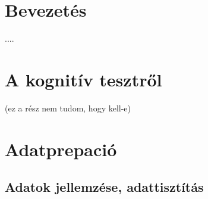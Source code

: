 \documentclass[12pt]{article}
\begin{document}
\tableofcontents


\section{Bevezetés}
....


\section{A kognitív tesztről}

(ez a rész nem tudom, hogy kell-e)

\newpage

\section{Adatprepació}

\subsection{Adatok jellemzése, adattisztítás}
\end{document}
